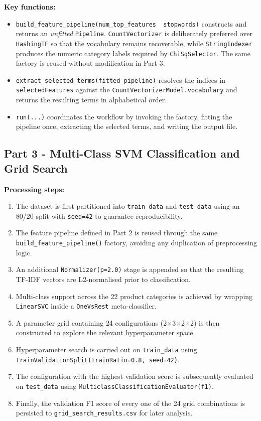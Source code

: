 \documentclass[11pt,a4paper]{extarticle}
\begin{document}
\vspace{0.4em}
\textbf{Key functions:}

\begin{itemize}
    \item \texttt{build\_feature\_pipeline(num\_top\_features\, stopwords)} constructs and returns an \emph{unfitted} \texttt{Pipeline}. \texttt{CountVectorizer} is deliberately preferred over \texttt{HashingTF} so that the vocabulary remains recoverable, while \texttt{StringIndexer} produces the numeric category labels required by \texttt{ChiSqSelector}. The same factory is reused without modification in Part 3.
    \item \texttt{extract\_selected\_terms(fitted\_pipeline)} resolves the indices in \texttt{selectedFeatures} against the \texttt{CountVectorizerModel.vocabulary} and returns the resulting terms in alphabetical order.
    \item \texttt{run(...)} coordinates the workflow by invoking the factory, fitting the pipeline once, extracting the selected terms, and writing the output file.
\end{itemize}

\subsection{Part 3 - Multi-Class SVM Classification and Grid Search}

\textbf{Processing steps:}
\begin{enumerate}
  \item The dataset is first partitioned into \texttt{train\_data} and \texttt{test\_data} using an 80/20 split with \texttt{seed=42} to guarantee reproducibility.
  \item The feature pipeline defined in Part 2 is reused through the same \texttt{build\_feature\_pipeline()} factory, avoiding any duplication of preprocessing logic.
  \item An additional \texttt{Normalizer(p=2.0)} stage is appended so that the resulting TF-IDF vectors are L2-normalised prior to classification.
  \item Multi-class support across the 22 product categories is achieved by wrapping \texttt{LinearSVC} inside a \texttt{OneVsRest} meta-classifier.
  \item A parameter grid containing 24 configurations (2$\times$3$\times$2$\times$2) is then constructed to explore the relevant hyperparameter space.
  \item Hyperparameter search is carried out on \texttt{train\_data} using \texttt{TrainValidationSplit(trainRatio=0.8, seed=42)}.
  \item The configuration with the highest validation score is subsequently evaluated on \texttt{test\_data} using \texttt{MulticlassClassificationEvaluator(f1)}.
  \item Finally, the validation F1 score of every one of the 24 grid combinations is persisted to \texttt{grid\_search\_results.csv} for later analysis.
\end{enumerate}
\end{document}

